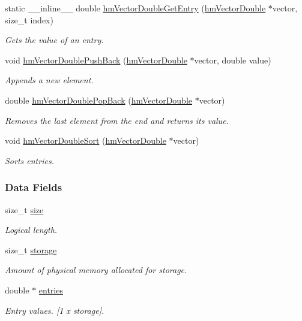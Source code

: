 \begin{DoxyCompactItemize}
static \-\_\-\-\_\-inline\-\_\-\-\_\- double \hyperlink{structhm_vector_double_acbc7a2a20d7572b818555f58919a3565}{hm\-Vector\-Double\-Get\-Entry} (\hyperlink{structhm_vector_double}{hm\-Vector\-Double} $\ast$vector, size\-\_\-t index)
\begin{DoxyCompactList}\small\item\em Gets the value of an entry. \end{DoxyCompactList}\item 
void \hyperlink{structhm_vector_double_a2c455e2b665cd8d2d3ab2fe9ec1f5f03}{hm\-Vector\-Double\-Push\-Back} (\hyperlink{structhm_vector_double}{hm\-Vector\-Double} $\ast$vector, double value)
\begin{DoxyCompactList}\small\item\em Appends a new element. \end{DoxyCompactList}\item 
double \hyperlink{structhm_vector_double_a577cfc888bb8f2f8eaf152059ea40e09}{hm\-Vector\-Double\-Pop\-Back} (\hyperlink{structhm_vector_double}{hm\-Vector\-Double} $\ast$vector)
\begin{DoxyCompactList}\small\item\em Removes the last element from the end and returns its value. \end{DoxyCompactList}\item 
void \hyperlink{structhm_vector_double_a752b01c56b0ede9e1113561ca23f74a2}{hm\-Vector\-Double\-Sort} (\hyperlink{structhm_vector_double}{hm\-Vector\-Double} $\ast$vector)
\begin{DoxyCompactList}\small\item\em Sorts entries. \end{DoxyCompactList}\end{DoxyCompactItemize}
\subsubsection*{Data Fields}
\begin{DoxyCompactItemize}
\item 
size\-\_\-t \hyperlink{structhm_vector_double_a854352f53b148adc24983a58a1866d66}{size}
\begin{DoxyCompactList}\small\item\em Logical length. \end{DoxyCompactList}\item 
size\-\_\-t \hyperlink{structhm_vector_double_ad69ae78713b41381c4d71371aae6e63e}{storage}
\begin{DoxyCompactList}\small\item\em Amount of physical memory allocated for storage. \end{DoxyCompactList}\item 
double $\ast$ \hyperlink{structhm_vector_double_a6174721ab7cd68c9ad7a482500ce108d}{entries}
\begin{DoxyCompactList}\small\item\em Entry values. \mbox{[}1 x storage\mbox{]}. \end{DoxyCompactList}\end{DoxyCompactItemize}


